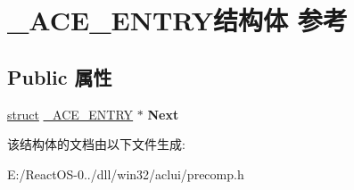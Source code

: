 \hypertarget{struct___a_c_e___e_n_t_r_y}{}\section{\+\_\+\+A\+C\+E\+\_\+\+E\+N\+T\+R\+Y结构体 参考}
\label{struct___a_c_e___e_n_t_r_y}
\subsection*{Public 属性}
\begin{DoxyCompactItemize}
\item 
\mbox{\label{struct___a_c_e___e_n_t_r_y_a11074da995ebc1654fff2a4d115fd4ad}} 
\hyperlink{interfacestruct}{struct} \hyperlink{struct___a_c_e___e_n_t_r_y}{\+\_\+\+A\+C\+E\+\_\+\+E\+N\+T\+RY} $\ast$ {\bfseries Next}
\end{DoxyCompactItemize}


该结构体的文档由以下文件生成\+:\begin{DoxyCompactItemize}
\item 
E\+:/\+React\+O\+S-\/0../dll/win32/aclui/precomp.\+h\end{DoxyCompactItemize}
